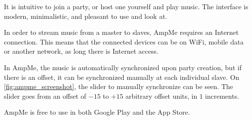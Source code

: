 It is intuitive to join a party, or host one yourself and play music.
The interface is modern, minimalistic, and pleasant to use and look at.

In order to stream music from a master to slaves, AmpMe requires an Internet connection.
This means that the connected devices can be on WiFi, mobile data or another network, as long there is Internet access.

In AmpMe, the music is automatically synchronized upon party creation, but if there is an offset, it can be synchronized manually at each individual slave.
On \cref{fig:ampme_screenshot}, the slider to manually synchronize can be seen.
The slider goes from an offset of $-15$ to $+15$ arbitrary offset units, in $1$ increments.

AmpMe is free to use in both Google Play and the App Store.\cite{amp_faq}\cite{amp_play}\cite{amp_itunes}

